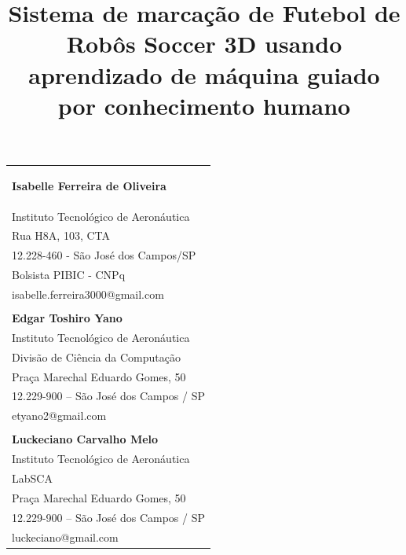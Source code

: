 \documentclass[10pt,fleqn,a4paper]{article}
\begin{document}
    
	{
	}
    \thispagestyle{firststyle}
    \vspace{-.5cm}
    \hspace{-.8cm}
    \begin{tabular}{p{\textwidth}}
    \begin{center}
    \vspace{-.6cm}
    \title{Sistema de marcação de Futebol de Robôs Soccer 3D usando aprendizado de máquina guiado por conhecimento humano}
    \end{center}
    \textbf{Isabelle Ferreira de Oliveira}\\
    \small{Instituto Tecnológico de Aeronáutica}\\
    \small{Rua H8A, 103, CTA}\\
    \small{12.228-460 - São José dos Campos/SP}\\
    \small{Bolsista PIBIC - CNPq}\\
    \small{isabelle.ferreira3000@gmail.com}\\
    \\ 
    \textbf{Edgar Toshiro Yano}\\
    \small{Instituto Tecnológico de Aeronáutica}\\
    \small{Divisão de Ciência da Computação}\\
    \small{Praça Marechal Eduardo Gomes, 50}\\
    \small{12.229-900 – São José dos Campos / SP}\\
    \small{etyano2@gmail.com}\\
    \\ 
    \textbf{Luckeciano Carvalho Melo}\\
    \small{Instituto Tecnológico de Aeronáutica}\\
    \small{LabSCA}\\
    \small{Praça Marechal Eduardo Gomes, 50}\\
    \small{12.229-900 – São José dos Campos / SP}\\
    \small{luckeciano@gmail.com}\\

\end{tabular}
\end{document}

